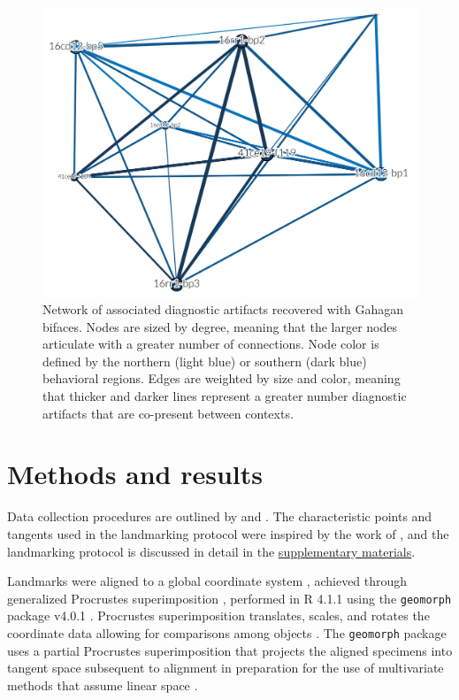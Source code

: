 \documentclass[]{interact}
\theoremstyle{plain}%
\theoremstyle{definition}
\theoremstyle{remark}
\begin{document}
\begin{figure}

{\centering \includegraphics[width=0.7\linewidth]{img/fig04} 

}

\caption{Network of associated diagnostic artifacts recovered with Gahagan bifaces. Nodes are sized by degree, meaning that the larger nodes articulate with a greater number of connections. Node color is defined by the northern (light blue) or southern (dark blue) behavioral regions. Edges are weighted by size and color, meaning that thicker and darker lines represent a greater number diagnostic artifacts that are co-present between contexts.}\label{fig:associated.net}
\end{figure}

\hypertarget{methods-and-results}{%
\section{Methods and results}\label{methods-and-results}}

Data collection procedures are outlined by \cite{RN8154} and
\cite{RN8318}. The characteristic points and tangents used in the
landmarking protocol were inspired by the work of \cite{RN5700}, and the
landmarking protocol is discussed in detail in the
\href{https://seldenlab.github.io/gahaganmorph.3/}{supplementary
materials}.

Landmarks were aligned to a global coordinate system
\citep{RN8102,RN8587,RN8384}, achieved through generalized Procrustes
superimposition \citep{RN8525}, performed in R 4.1.1 \citep{RN8584}
using the \texttt{geomorph} package v4.0.1 \citep{RN8565,RN9565}.
Procrustes superimposition translates, scales, and rotates the
coordinate data allowing for comparisons among objects
\citep{RN5698,RN8525}. The \texttt{geomorph} package uses a partial
Procrustes superimposition that projects the aligned specimens into
tangent space subsequent to alignment in preparation for the use of
multivariate methods that assume linear space \citep{RN8511,RN8384}.
\end{document}
